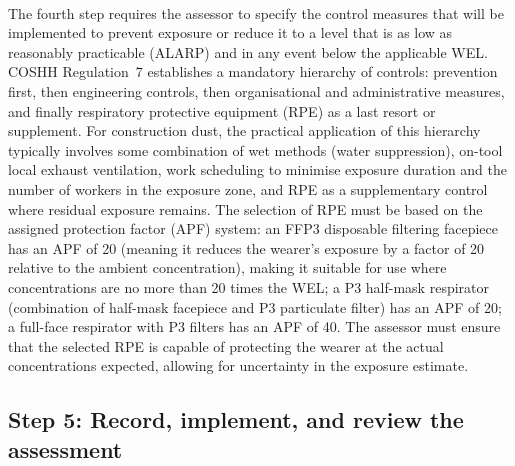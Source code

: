 \paragraph{}
The fourth step requires the assessor to specify the control measures that will be implemented to prevent exposure or reduce it to a level that is as low as reasonably practicable (ALARP) and in any event below the applicable WEL. COSHH Regulation~7 establishes a mandatory hierarchy of controls: prevention first, then engineering controls, then organisational and administrative measures, and finally respiratory protective equipment (RPE) as a last resort or supplement. For construction dust, the practical application of this hierarchy typically involves some combination of wet methods (water suppression), on-tool local exhaust ventilation, work scheduling to minimise exposure duration and the number of workers in the exposure zone, and RPE as a supplementary control where residual exposure remains. The selection of RPE must be based on the assigned protection factor (APF) system: an FFP3 disposable filtering facepiece has an APF of 20 (meaning it reduces the wearer's exposure by a factor of 20 relative to the ambient concentration), making it suitable for use where concentrations are no more than 20 times the WEL; a P3 half-mask respirator (combination of half-mask facepiece and P3 particulate filter) has an APF of 20; a full-face respirator with P3 filters has an APF of 40. The assessor must ensure that the selected RPE is capable of protecting the wearer at the actual concentrations expected, allowing for uncertainty in the exposure estimate.

\subsection{Step 5: Record, implement, and review the assessment}

